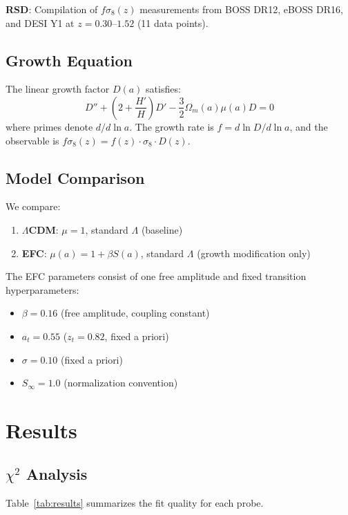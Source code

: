 \documentclass[12pt,a4paper]{article}
\begin{document}
\textbf{RSD}: Compilation of $f\sigma_8(z)$ measurements from BOSS DR12, eBOSS DR16, and 
DESI Y1 at $z = 0.30$--$1.52$ (11 data points).

\subsection{Growth Equation}

The linear growth factor $D(a)$ satisfies:
\begin{equation}
D'' + \left(2 + \frac{H'}{H}\right) D' - \frac{3}{2} \Omega_m(a) \mu(a) D = 0
\end{equation}
where primes denote $d/d\ln a$. The growth rate is $f = d\ln D/d\ln a$, and the 
observable is $f\sigma_8(z) = f(z) \cdot \sigma_8 \cdot D(z)$.

\subsection{Model Comparison}

We compare:
\begin{enumerate}
\item \textbf{$\Lambda$CDM}: $\mu = 1$, standard $\Lambda$ (baseline)
\item \textbf{EFC}: $\mu(a) = 1 + \beta S(a)$, standard $\Lambda$ (growth modification only)
\end{enumerate}

The EFC parameters consist of one free amplitude and fixed transition hyperparameters:
\begin{itemize}
\item $\beta = 0.16$ (free amplitude, coupling constant)
\item $a_t = 0.55$ ($z_t = 0.82$, fixed a priori)
\item $\sigma = 0.10$ (fixed a priori)
\item $S_\infty = 1.0$ (normalization convention)
\end{itemize}

\section{Results}

\subsection{$\chi^2$ Analysis}

Table~\ref{tab:results} summarizes the fit quality for each probe.
\end{document}
